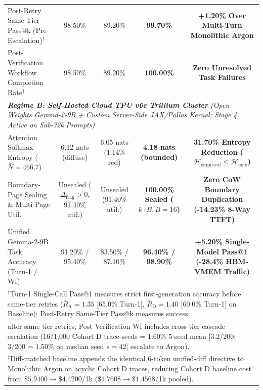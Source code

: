 \documentclass[conference,10pt]{IEEEtran}
\begin{document}
\begin{table}[t]
{\begin{tabular}{lcccc}
Post-Retry Same-Tier Pass@k (Pre-Escalation)$^\dagger$ & 98.50\% & 89.20\% & \textbf{99.70\%} & \textbf{+1.20\% Over Multi-Turn Monolithic Argon} \\
Post-Verification Workflow Completion Rate$^\dagger$ & 98.50\% & 89.20\% & \textbf{100.00\%} & \textbf{Zero Unresolved Task Failures} \\
\midrule
\multicolumn{5}{l}{\textit{\textbf{Regime B: Self-Hosted Cloud TPU v6e Trillium Cluster} (Open-Weights Gemma-2-9B + Custom Server-Side JAX/Pallas Kernel; Stage 4 Active on Sub-32k Prompts)}} \\
Attention Softmax Entropy ($\bar{N}=466.7$) & 6.12 nats (diffuse) & 6.05 nats (1.14\% red) & \textbf{4.18 nats (bounded)} & \textbf{31.70\% Entropy Reduction ($\mathcal{H}_{\text{empirical}} \le \mathcal{H}_{\max}$)} \\
Boundary-Page Sealing \& Multi-Page Util. & Unsealed ($\Delta_{\text{frag}} > 0$, 91.40\% util.) & Unsealed (91.40\% util.) & \textbf{100.00\% Sealed ($k \cdot B, B=16$)} & \textbf{Zero CoW Boundary Duplication (-14.23\% 8-Way TTFT)} \\
Unified Gemma-2-9B Task Accuracy (Turn-1 / Wf) & 91.20\% / 95.40\% & 83.50\% / 87.10\% & \textbf{96.40\% / 98.90\%} & \textbf{+5.20\% Single-Model Pass@1 (-28.4\% HBM-VMEM Traffic)} \\
\bottomrule
\multicolumn{5}{l}{\scriptsize $^\dagger$Turn-1 Single-Call Pass@1 measures strict first-generation accuracy before same-tier retries ($\bar{R}_{\text{A}}=1.35$ [65.0\% Turn-1], $\bar{R}_{\text{D}}=1.40$ [60.0\% Turn-1] on Baseline); Post-Retry Same-Tier Pass@k measures success} \\
\multicolumn{5}{l}{\scriptsize after same-tier retries; Post-Verification Wf includes cross-tier cascade escalation (16/1,000 Cohort D trace-seeds = 1.60\% 5-seed mean [3.2/200; 3/200 = 1.50\% on median seed $s=42$] escalate to Argon).} \\
\multicolumn{5}{l}{\scriptsize $^\ddagger$Diff-matched baseline appends the identical 6-token unified-diff directive to Monolithic Argon on acyclic Cohort D traces, reducing Cohort D baseline cost from $\$5.9400 \to \$4.4200$/1k ($\$1.7608 \to \$1.4568$/1k pooled).}
\end{tabular}%
}
\end{table}
\end{document}

